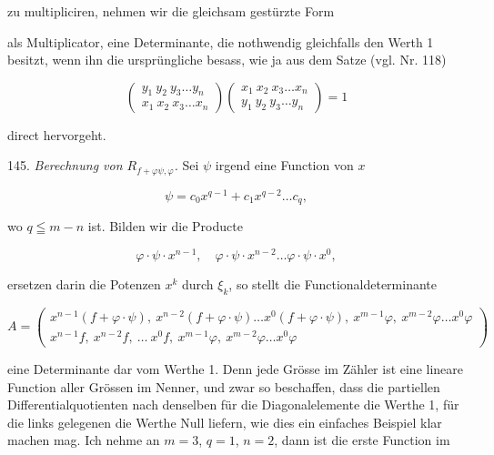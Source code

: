 zu multipliciren, nehmen wir die gleichsam gest\"urzte Form


als Multiplicator, eine Determinante, die nothwendig gleichfalls den Werth 1 besitzt, wenn
ihn die urspr\"ungliche besass, wie ja aus dem Satze (vgl. Nr. 118)

\[
\left(
\begin{array}{cc}
y_1\ y_2\ y_3 \ldots y_n \\
x_1\ x_2\ x_3 \ldots x_n
\end{array}
\right)
\left(
\begin{array}{cc}
x_1\ x_2\ x_3 \ldots x_n \\
y_1\ y_2\ y_3 \ldots y_n
\end{array}
\right)
= 1
\]

direct hervorgeht.

145. \textit{Berechnung von $R_{f+\varphi\psi,\varphi}$.} Sei $\psi$ irgend eine Function
von $x$

\[ \psi = c_0x^{q-1} + c_1x^{q-2}\ldots c_q, \]

wo $q \leqq m-n$ ist. Bilden wir die Producte

\[ \varphi\cdot\psi\cdot x^{n-1},\quad \varphi\cdot\psi\cdot x^{n-2}\ldots \varphi\cdot\psi\cdot x^0, \]

ersetzen darin die Potenzen $x^k$ durch $\xi_k$, so stellt die Functionaldeterminante

\[
A =
\left(
\begin{array}{cc}
x^{n-1}(f+\varphi\cdot\psi),\ x^{n-2}(f+\varphi\cdot\psi)\ldots x^0(f+\varphi\cdot\psi),\ x^{m-1}\varphi,\ x^{m-2}\varphi\ldots x^0\varphi \\
x^{n-1}f,\ x^{n-2}f,\ \ldots\ x^0f,\ x^{m-1}\varphi,\ x^{m-2}\varphi\ldots x^0\varphi
\end{array}
\right)
\]

eine Determinante dar vom Werthe 1. Denn jede Gr\"osse im Z\"ahler ist eine lineare
Function aller Gr\"ossen im Nenner, und zwar so beschaffen, dass die partiellen
Differentialquotienten nach denselben f\"ur die Diagonalelemente die Werthe 1, f\"ur die
links gelegenen die Werthe Null liefern, wie dies ein einfaches Beispiel klar machen mag.
Ich nehme an $m=3$, $q=1$, $n=2$, dann ist die erste Function im


